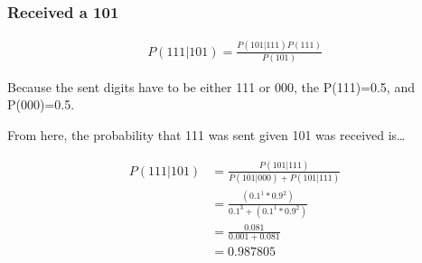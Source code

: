 \documentclass[12pt]{article}
\begin{document}
\subsubsection{Received a 101}\label{ssub:received_a_101}

\begin{align*}
  P(111|101) = \frac{P(101|111)P(111)}{P(101)}
\end{align*}

Because the sent digits have to be either 111 or 000, the P(111)=0.5, and P(000)=0.5.

From here, the probability that 111 was sent given 101 was received is\ldots

\begin{align*}
  P(111|101) &= \frac{P(101|111)}{P(101|000) + P(101|111)}\\
             &= \frac{(0.1^1*0.9^2)}{0.1^3 + (0.1^1*0.9^2)}\\
             &= \frac{0.081}{0.001 + 0.081}\\
             &= 0.987805
\end{align*}
\end{document}
